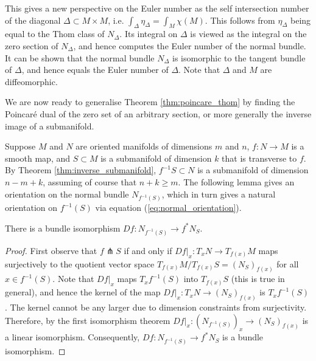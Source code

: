 This gives a new perspective on the Euler number as the self intersection number 
of the diagonal $\Delta \subset M\times M$, i.e. 
$\int_\Delta \eta_\Delta = \int_M\chi(M)$. This follows from $\eta_\Delta$
being equal to the Thom class of $N_\Delta$. Its integral on $\Delta$ is viewed
as the integral on the zero section of $N_\Delta$, and hence computes the Euler
number of the normal bundle. It can be shown that the
normal bundle $N_\Delta$ is isomorphic to the tangent bundle of
$\Delta$,\cite[Lemma 11.23]{bott_tu}
and hence equals the Euler number of $\Delta$. Note that $\Delta$
and $M$ are diffeomorphic.

We are now ready to generalise Theorem \ref{thm:poincare_thom} 
by finding the Poincar\'e dual of the zero set of an arbitrary section, or more
generally the inverse image of a submanifold.

Suppose $M$ and $N$ are oriented manifolds of dimensions $m$
and $n$, $f:N\to M$ is a smooth map, and
$S \subset M$ is a submanifold of dimension $k$ that is transverse to $f$. 
By Theorem \ref{thm:inverse_submanifold}, $f^{-1}S\subset N$ is a submanifold 
of dimension $n-m+k$, assuming of course that $n+k \geq m$. 
The following lemma gives an orientation on the normal
bundle $N_{f^{-1}(S)}$, which in turn gives a natural orientation on $f^{-1}(S)$
via equation (\ref{eq:normal_orientation}). 

\begin{lem} \label{lem:normal_isomorphism}
	There is a bundle isomorphism $Df : N_{f^{-1}(S)} \to f^*N_{S}$.
\end{lem}
\begin{proof}
	First observe that $f \pitchfork S$ if and only if  $Df|_x : T_x N \to
	T_{f(x)}M$ maps surjectively to the quotient vector space $T_{f(x)}M /T_{f(x)} S =
	(N_S)_{f(x)}$ for all $x\in f^{-1}(S)$. Note that $Df|_x$ maps
	$T_xf^{-1}(S)$ into $T_{f(x)}S$ (this is true in general), and hence
	the kernel of the map $Df|_x : T_x N \to (N_S)_{f(x)}$ is $T_xf^{-1}(S)$. 
	The kernel cannot be any larger due to dimension constraints from
	surjectivity. Therefore, by the first isomorphism theorem 
	$Df|_x : (N_{f^{-1}(S)})_x \to (N_S)_{f(x)}$ is a linear
	isomorphism. Consequently, 
	$Df : N_{f^{-1}(S)} \to f^*N_{S}$ is a bundle isomorphism. 
\end{proof}


